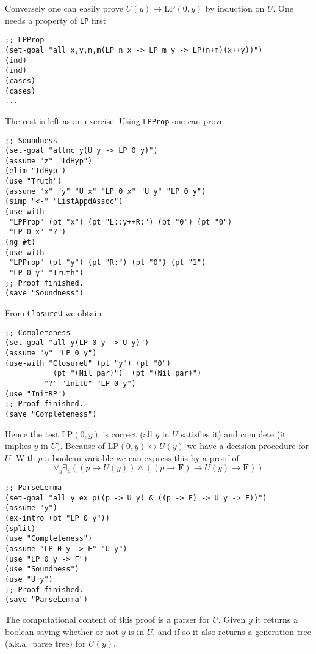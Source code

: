 \documentclass[12pt]{amsart}
\newcommand{\ex}{\exists} %
\newcommand{\falsityF}{\mathbf{F}}
\begin{document}
Conversely one can easily prove $U(y) \to \mathrm{LP}(0,y)$ by
induction on $U$.  One needs a property of \verb|LP| first
\begin{verbatim}
;; LPProp
(set-goal "all x,y,n,m(LP n x -> LP m y -> LP(n+m)(x++y))")
(ind)
(ind)
(cases)
(cases)
...
\end{verbatim}
The rest is left as an exercise.  Using \verb|LPProp| one can prove
\begin{verbatim}
;; Soundness
(set-goal "allnc y(U y -> LP 0 y)")
(assume "z" "IdHyp")
(elim "IdHyp")
(use "Truth")
(assume "x" "y" "U x" "LP 0 x" "U y" "LP 0 y")
(simp "<-" "ListAppdAssoc")
(use-with
 "LPProp" (pt "x") (pt "L::y++R:") (pt "0") (pt "0")
 "LP 0 x" "?")
(ng #t)
(use-with
 "LPProp" (pt "y") (pt "R:") (pt "0") (pt "1")
 "LP 0 y" "Truth")
;; Proof finished.
(save "Soundness")
\end{verbatim}
From \verb|ClosureU| we obtain 
\begin{verbatim}
;; Completeness
(set-goal "all y(LP 0 y -> U y)")
(assume "y" "LP 0 y")
(use-with "ClosureU" (pt "y") (pt "0")
           (pt "(Nil par)")  (pt "(Nil par)")
         "?" "InitU" "LP 0 y")
(use "InitRP")
;; Proof finished.
(save "Completeness")
\end{verbatim}
Hence the test $\mathrm{LP}(0,y)$ is correct (all $y$ in $U$ satisfies
it) and complete (it implies $y$ in $U$).  Because of
$\mathrm{LP}(0,y) \leftrightarrow U(y)$ we have a decision procedure
for $U$.  With $p$ a boolean variable we can express this by a proof
of
\begin{equation*}
 \forall_y \ex_p((p \to U(y)) \land
                 ((p \to \falsityF) \to U(y) \to \falsityF))
\end{equation*}
\begin{verbatim}
;; ParseLemma
(set-goal "all y ex p((p -> U y) & ((p -> F) -> U y -> F))")
(assume "y")
(ex-intro (pt "LP 0 y"))
(split)
(use "Completeness")
(assume "LP 0 y -> F" "U y")
(use "LP 0 y -> F")
(use "Soundness")
(use "U y")
;; Proof finished.
(save "ParseLemma")
\end{verbatim}
The computational content of this proof is a parser for $U$.  Given
$y$ it returns a boolean saying whether or not $y$ is in $U$, and if
so it also returns a generation tree (a.k.a.\ parse tree) for $U(y)$.
\end{document}
